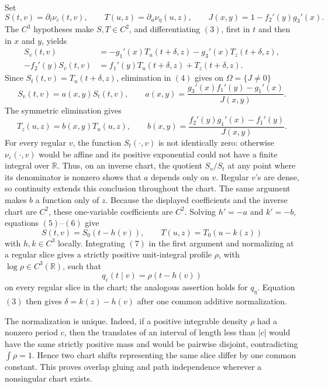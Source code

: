 Set
\[
 S(t,v)=\partial_t\nu_\varepsilon(t,v),\qquad
 T(u,z)=\partial_u\nu_\eta(u,z),\qquad
 J(x,y)=1-f_2'(y)g_3'(x).
\]
The \(C^3\) hypotheses make \(S,T\in C^2\), and differentiating \((3)\), first in \(t\) and then in \(x\) and \(y\), yields
\[
 \begin{aligned}
  S_v(t,v)&=-g_1'(x)T_u(t+\delta,z)-g_3'(x)T_z(t+\delta,z),\\
  -f_2'(y)S_v(t,v)&=f_1'(y)T_u(t+\delta,z)+T_z(t+\delta,z).
 \end{aligned}
\tag{4}
\]
Since \(S_t(t,v)=T_u(t+\delta,z)\), elimination in \((4)\) gives on \(\Omega=\{J\ne0\}\)
\[
 S_v(t,v)=a(x,y)S_t(t,v),\qquad
 a(x,y)=\frac{g_3'(x)f_1'(y)-g_1'(x)}{J(x,y)}.
\tag{5}
\]
The symmetric elimination gives
\[
 T_z(u,z)=b(x,y)T_u(u,z),\qquad
 b(x,y)=\frac{f_2'(y)g_1'(x)-f_1'(y)}{J(x,y)}.
\tag{6}
\]
For every regular \(v\), the function \(S_t(\mathord\cdot,v)\) is not identically zero: otherwise \(\nu_\varepsilon(\mathord\cdot,v)\) would be affine and its positive exponential could not have a finite integral over \(\mathbb R\).  Thus, on an inverse chart, the quotient \(S_v/S_t\) at any point where its denominator is nonzero shows that \(a\) depends only on \(v\).  Regular \(v\)'s are dense, so continuity extends this conclusion throughout the chart.  The same argument makes \(b\) a function only of \(z\).  Because the displayed coefficients and the inverse chart are \(C^2\), these one-variable coefficients are \(C^2\).  Solving \(h'=-a\) and \(k'=-b\), equations \((5)\)--\((6)\) give
\[
 S(t,v)=S_0(t-h(v)),\qquad T(u,z)=T_0(u-k(z))
\tag{7}
\]
with \(h,k\in C^3\) locally.  Integrating \((7)\) in the first argument and normalizing at a regular slice gives a strictly positive unit-integral profile \(\rho\), with \(\log\rho\in C^3(\mathbb R)\), such that
\[
 q_\varepsilon(t\mid v)=\rho(t-h(v))
\tag{8}
\]
on every regular slice in the chart; the analogous assertion holds for \(q_\eta\).  Equation \((3)\) then gives \(\delta=k(z)-h(v)\) after one common additive normalization.

The normalization is unique.  Indeed, if a positive integrable density \(\rho\) had a nonzero period \(c\), then the translates of an interval of length less than \(|c|\) would have the same strictly positive mass and would be pairwise disjoint, contradicting \(\int\rho=1\).  Hence two chart shifts representing the same slice differ by one common constant.  This proves overlap gluing and path independence wherever a nonsingular chart exists.

